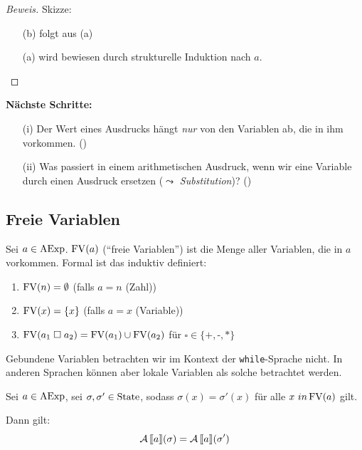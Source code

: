 \begin{proof}[Beweis]
    Skizze:
    \begin{enumerate}
        \item[(b)] folgt aus (a)
        \item[(a)] wird bewiesen durch strukturelle Induktion nach $a$.
    \end{enumerate}
\end{proof}

\par\bigskip
\textbf{Nächste Schritte:}
\begin{enumerate}
    \item[(i)] Der Wert eines Ausdrucks hängt \emph{nur} von den Variablen ab, die in ihm vorkommen. ()
    \item[(ii)] Was passiert in einem arithmetischen Ausdruck, wenn wir eine Variable durch einen Ausdruck ersetzen ($\leadsto$ \emph{Substitution})? ()
\end{enumerate}



\subsection{Freie Variablen} \label{section:freeVars}

\begin{definition}
    Sei $a \in \operatorname{AExp}$. $\operatorname{FV}(a)$ (``freie Variablen'') ist die Menge aller Variablen, die in $a$ vorkommen. Formal ist das induktiv definiert:
    \begin{enumerate}
        \item $\operatorname{FV}(n) = \emptyset$ \quad\quad\quad (falls $a = n$ (Zahl))
        \item $\operatorname{FV}(x) = \{ x \}$ \quad\quad (falls $a = x$ (Variable))
        \item $\operatorname{FV}(a_1 \;\square\; a_2) = \operatorname{FV}(a_1) \cup \operatorname{FV}(a_2)$ \quad\quad für $\square \in \{ \texttt{+}, \texttt{-}, \texttt{*} \}$
    \end{enumerate}

    Gebundene Variablen betrachten wir im Kontext der \texttt{while}-Sprache nicht. In anderen Sprachen können aber lokale Variablen \zb{} als solche betrachtet werden.
\end{definition}

\par\medskip
\begin{lemma}
    Sei $a \in \operatorname{AExp}$, sei $\sigma, \sigma' \in \operatorname{State}$, sodass $\sigma(x) = \sigma'(x)$ für alle $x \ in\operatorname{FV}(a)$ gilt.

    Dann gilt:
    \[
    \operatorname{\mathcal{A}}\mathrm{[}\kern-.14em\mathrm{[} a \mathrm{]}\kern-.14em\mathrm{]}(\sigma) = \operatorname{\mathcal{A}}\mathrm{[}\kern-.14em\mathrm{[} a \mathrm{]}\kern-.14em\mathrm{]}(\sigma')
    \]
\end{lemma}

